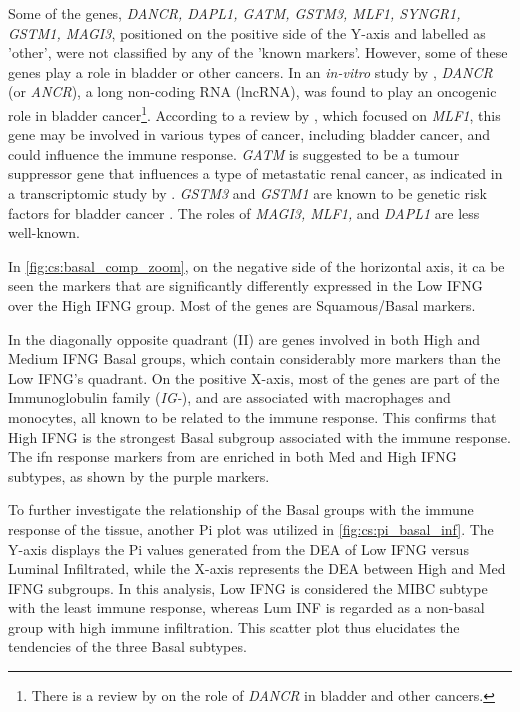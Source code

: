 Some of the genes, \textit{DANCR, DAPL1, GATM, GSTM3, MLF1, SYNGR1, GSTM1, MAGI3}, positioned on the positive side of the Y-axis and labelled as 'other', were not classified by any of the 'known markers'. However, some of these genes play a role in bladder or other cancers. In an \textit{in-vitro} study by \citet{Zhan2018-um}, \textit{DANCR} (or \textit{ANCR}), a long non-coding RNA (lncRNA), was found to play an oncogenic role in bladder cancer\footnote{There is a review by \citet{Wang2021-gn} on the role of \textit{DANCR} in bladder and other cancers.}. According to a review by \citet{Li2023-mk}, which focused on \textit{MLF1}, this gene may be involved in various types of cancer, including bladder cancer, and could influence the immune response. \textit{GATM} is suggested to be a tumour suppressor gene that influences a type of metastatic renal cancer, as indicated in a transcriptomic study by \citet{Jee2022-wi}. \textit{GSTM3} and \textit{GSTM1} are known to be genetic risk factors for bladder cancer \citet{Schnakenberg2000-cu}. The roles of \textit{MAGI3, MLF1,} and \textit{DAPL1} are less well-known.

In \cref{fig:cs:basal_comp_zoom}, on the negative side of the horizontal axis, it ca be seen the markers that are significantly differently expressed in the Low IFNG over the High IFNG group. Most of the genes are Squamous/Basal markers.

In the diagonally opposite quadrant (II) are genes involved in both High and Medium IFNG Basal groups, which contain considerably more markers than the Low IFNG's quadrant. On the positive X-axis, most of the genes are part of the Immunoglobulin family (\textit{IG-}), and are associated with macrophages and monocytes, all known to be related to the immune response. This confirms that High IFNG is the strongest Basal subgroup associated with the immune response. The \acrshort{ifn} response markers from \citet{Baker2022-bj} are enriched in both Med and High IFNG subtypes, as shown by the purple markers.


To further investigate the relationship of the Basal groups with the immune response of the tissue, another Pi plot was utilized in \cref{fig:cs:pi_basal_inf}. The Y-axis displays the Pi values generated from the DEA of Low IFNG versus Luminal Infiltrated, while the X-axis represents the DEA between High and Med IFNG subgroups. In this analysis, Low IFNG is considered the MIBC subtype with the least immune response, whereas Lum INF is regarded as a non-basal group with high immune infiltration. This scatter plot thus elucidates the tendencies of the three Basal subtypes.


